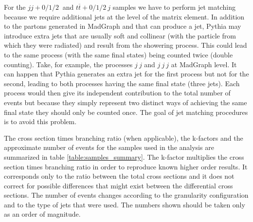 For the $jj+0/1/2 ~$ and $t\overline{t}+0/1/2 ~j$ samples we have to perform jet matching because we require additional jets at the level of the matrix element. In addition to the partons generated in MadGraph and that can produce a jet, Pythia may introduce extra jets that are usually soft and collinear (with the particle from which they were radiated) and result from the showering process. This could lead to the same process (with the same final states) being counted twice (double counting). Take, for example, the processes $j~j$ and  $j~j~j$ at MadGraph level. It can happen that Pythia generates an extra jet for the first process but not for the second, leading to both processes having the same final state (three jets). Each process would then give its independent contribution to the total number of events but because they simply represent two distinct ways of achieving the same final state they should only be counted once. The goal of jet matching procedures is to avoid this problem. 


The cross section times branching ratio (when applicable), the k-factors and the approximate number of events for the samples used in the analysis are summarized in table \ref{table:samples_summary}. The k-factor multiplies the cross section times branching ratio in order to reproduce known higher order results. It corresponds only to the ratio between the total cross sections and it does not correct for possible differences that might exist between the differential cross sections. The number of events changes according to the granularity configuration and to the type of jets that were used. The numbers shown should be taken only as an order of magnitude.

